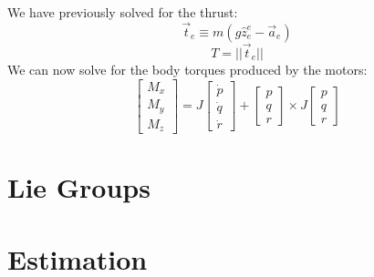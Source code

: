 \documentclass[10pt]{book}
\begin{document}
We have previously solved for the thrust:
%
$$\vec{t}_e \equiv m( g \hat{z}^e_e - \vec{a}_e)$$
%
$$T = ||\vec{t}_e||$$
%
We can now solve for the body torques produced by the motors:
%
$$\begin{bmatrix}M_x \\ M_y \\ M_z \end{bmatrix} = J \begin{bmatrix}
\dot{p} \\ \dot{q} \\ \dot{r}
\end{bmatrix} + \begin{bmatrix}p \\ q \\ r\end{bmatrix} \times J \begin{bmatrix}p \\ q \\ r\end{bmatrix}$$

\chapter{Lie Groups}

\chapter{Estimation}

\end{document}
